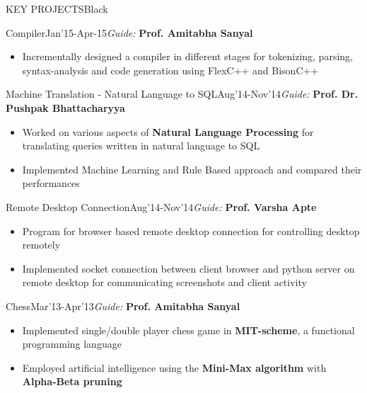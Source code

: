 \documentclass[11pt,a4paper]{article} %
\begin{document}
\begin{ressection}{KEY PROJECTS}{Black}

  
\begin{ressubsection}{Compiler}{Jan'15-Apr-15}{\textit{Guide:} \textbf{Prof. Amitabha Sanyal}}
\begin{itemize}
\itemsep-0.3em
\item Incrementally designed a compiler in different stages for tokenizing, parsing, syntax-analysis and code generation using FlexC++ and BisonC++
\end{itemize}
\end{ressubsection}

\begin{ressubsection}{Machine Translation - Natural Language to SQL}{Aug'14-Nov'14}{\textit{Guide:} \textbf{Prof. Dr. Pushpak Bhattacharyya}}
\begin{itemize}
\itemsep-0.3em
\item Worked on various aspects of \textbf{Natural Language Processing} for translating queries written in natural language to SQL
\item Implemented Machine Learning and Rule Based approach and compared their performances
\end{itemize}
\end{ressubsection}

\begin{ressubsection}{Remote Desktop Connection}{Aug'14-Nov'14}{\textit{Guide:} \textbf{Prof. Varsha Apte}}
\begin{itemize}
\itemsep-0.3em
\item Program for browser based remote desktop connection for controlling desktop remotely
\item Implemented socket connection between client browser and python server on remote desktop for communicating screenshots and client activity
\end{itemize}
\end{ressubsection}


\begin{ressubsection}{Chess}{Mar'13-Apr'13}{\textit{Guide:} \textbf{Prof. Amitabha Sanyal}}
\begin{itemize}
\itemsep-0.3em
\item Implemented single/double player chess game in \textbf{MIT-scheme}, a functional programming language
\item Employed artificial intelligence using the \textbf{Mini-Max algorithm} with \textbf{Alpha-Beta pruning}
\end{itemize}
\end{ressubsection}


\end{ressection}
\end{document}
